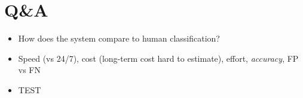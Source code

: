 \documentclass{beamer}
\begin{document}
\section{Q\&A}
\begin{frame}
  \begin{itemize}
	    \item How does the system compare to human classification?
	    \item Speed (vs 24/7), cost (long-term cost hard to estimate), effort, \emph{accuracy}, FP vs FN
	    \item TEST
  \end{itemize}
\end{frame}
\end{document}
